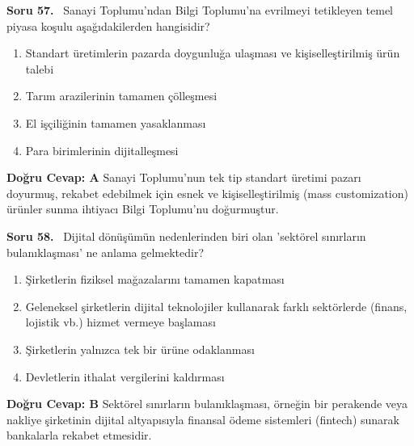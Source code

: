 \documentclass[11pt,a4paper,openany]{book}
\begin{document}
\needspace{5cm}
\vspace{8pt}
\noindent\textbf{\large\sffamily Soru 57.} \ Sanayi Toplumu'ndan Bilgi Toplumu'na evrilmeyi tetikleyen temel piyasa koşulu aşağıdakilerden hangisidir?
\begin{enumerate}[label=\Alph*), leftmargin=25pt, topsep=4pt, itemsep=2pt]
    \item Standart üretimlerin pazarda doygunluğa ulaşması ve kişiselleştirilmiş ürün talebi
    \item Tarım arazilerinin tamamen çölleşmesi
    \item El işçiliğinin tamamen yasaklanması
    \item Para birimlerinin dijitalleşmesi
\end{enumerate}
\vspace{4pt}
\begin{tcolorbox}[title=Cevap ve Açıklama, colback=gray!3!white, colframe=primarycolor!90!black, arc=2mm, fonttitle=\bfseries\sffamily, top=6pt, bottom=6pt]
    \textbf{Doğru Cevap: A}
    \vspace{2pt}
    Sanayi Toplumu'nun tek tip standart üretimi pazarı doyurmuş, rekabet edebilmek için esnek ve kişiselleştirilmiş (mass customization) ürünler sunma ihtiyacı Bilgi Toplumu'nu doğurmuştur.
\end{tcolorbox}
\vspace{10pt}

\needspace{5cm}
\vspace{8pt}
\noindent\textbf{\large\sffamily Soru 58.} \ Dijital dönüşümün nedenlerinden biri olan 'sektörel sınırların bulanıklaşması' ne anlama gelmektedir?
\begin{enumerate}[label=\Alph*), leftmargin=25pt, topsep=4pt, itemsep=2pt]
    \item Şirketlerin fiziksel mağazalarını tamamen kapatması
    \item Geleneksel şirketlerin dijital teknolojiler kullanarak farklı sektörlerde (finans, lojistik vb.) hizmet vermeye başlaması
    \item Şirketlerin yalnızca tek bir ürüne odaklanması
    \item Devletlerin ithalat vergilerini kaldırması
\end{enumerate}
\vspace{4pt}
\begin{tcolorbox}[title=Cevap ve Açıklama, colback=gray!3!white, colframe=primarycolor!90!black, arc=2mm, fonttitle=\bfseries\sffamily, top=6pt, bottom=6pt]
    \textbf{Doğru Cevap: B}
    \vspace{2pt}
    Sektörel sınırların bulanıklaşması, örneğin bir perakende veya nakliye şirketinin dijital altyapısıyla finansal ödeme sistemleri (fintech) sunarak bankalarla rekabet etmesidir.
\end{tcolorbox}
\vspace{10pt}
\end{document}
